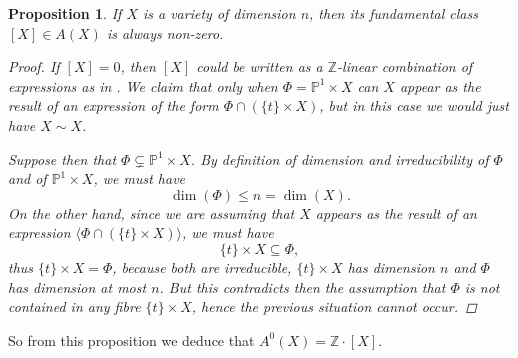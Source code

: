 \documentclass[12pt,a4paper]{amsart}
\theoremstyle{plain}
\newtheorem{prop}[thm]{Proposition}
\theoremstyle{definition}
\theoremstyle{remark}
\begin{document}
\begin{prop}
    If $X$ is a variety of dimension $n$, then its fundamental class $[X]\in A(X)$ is always non-zero.
    \begin{proof}
	If $[X]=0$, then $[X]$ could be written as a $\mathbb{Z}$-linear combination of expressions as in .
	We claim that only when $\Phi=\mathbb{P}^{1}\times X$ can $X$ appear as the result of an expression of the form $\Phi\cap (\{t\}\times X)$, but in this case we would just have $X\sim X$.

	Suppose then that $\Phi\subsetneq \mathbb{P}^{1}\times X$.
	By definition of dimension and irreducibility of $\Phi$ and of $\mathbb{P}^{1}\times X$, we must have
	\[ \dim(\Phi)\leq n=\dim(X). \]
	On the other hand, since we are assuming that $X$ appears as the result of an expression $\langle \Phi\cap (\{ t\}\times X)\rangle$, we must have
	\[ \{t\}\times X\subseteq \Phi, \]
	thus $\{t\}\times X=\Phi$, because both are irreducible, $\{t\}\times X$ has dimension $n$ and $\Phi$ has dimension at most $n$.
	But this contradicts then the assumption that $\Phi$ is not contained in any fibre $\{t\}\times X$, hence the previous situation cannot occur.
    \end{proof}
\end{prop}

So from this proposition we deduce that $A^{0}(X)=\mathbb{Z}\cdot [X]$.
\end{document}
